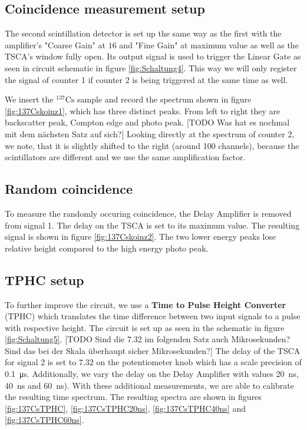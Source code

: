\subsection{Coincidence measurement setup}
%
The second scintillation detector is set up the same way as the first with the amplifier's "Coarse Gain" at $16$ and "Fine Gain" at maximum value as well as the TSCA's window fully open.
Its output signal is used to trigger the Linear Gate as seen in circuit schematic in figure \ref{fig:Schaltung4}.
This way we will only register the signal of counter 1 if counter 2 is being triggered at the same time as well.
%
\par
%
We insert the $^{137}\text{Cs}$ sample and record the spectrum shown in figure \ref{fig:137Cskoinz1}, which has three distinct peaks.
From left to right they are backscatter peak, Compton edge and photo peak.
[TODO Was hat es nochmal mit dem nächsten Satz auf sich?] Looking directly at the spectrum of counter 2, we note, that it is slightly shifted to the right (around 100 channels), because the scintillators are different and we use the same amplification factor.
%
\subsection{Random coincidence}
%
To measure the randomly occuring coincidence, the Delay Amplifier is removed from signal 1.
The delay on the TSCA is set to its maximum value.
The resulting signal is shown in figure \ref{fig:137Cskoinz2}.
The two lower energy peaks lose relative height compared to the high energy photo peak.
%
\subsection{TPHC setup}
%
To further improve the circuit, we use a \textbf{Time to Pulse Height Converter} (TPHC) which translates the time difference between two input signals to a pulse with respective height.
The circuit is set up as seen in the schematic in figure \ref{fig:Schaltung5}.
[TODO Sind die 7.32 im folgenden Satz auch Mikrosekunden? Sind das bei der Skala überhaupt sicher Mikrosekunden?] The delay of the TSCA for signal 2 is set to $7.32$ on the potentiometer knob which has a scale precision of \SI{0.1}{\micro\second}.
Additionally, we vary the delay on the Delay Amplifier with values \SI{20}{\nano\second}, \SI{40}{\nano\second} and \SI{60}{\nano\second}).
With these additional measurements, we are able to calibrate the resulting time spectrum.
The resulting spectra are shown in figures \ref{fig:137CsTPHC}, \ref{fig:137CsTPHC20ns}, \ref{fig:137CsTPHC40ns} and \ref{fig:137CsTPHC60ns}.
%
